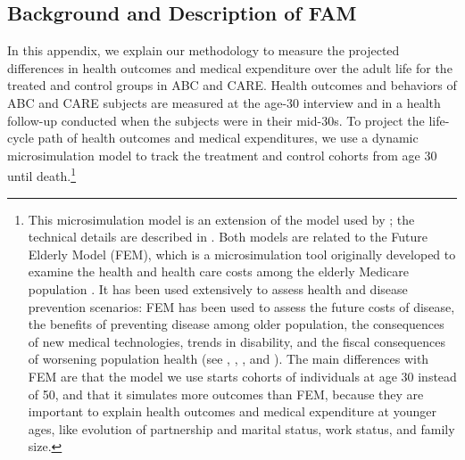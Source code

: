 \subsection{Background and Description of FAM}

\noindent In this appendix, we explain our methodology to measure the projected differences in health outcomes and medical expenditure over the adult life for the treated and control groups in ABC and CARE.
Health outcomes and behaviors of ABC and CARE subjects are measured at the age-30 interview and in a health follow-up conducted when the subjects were in their mid-30s.
To project the life-cycle path of health outcomes and medical expenditures, we use a dynamic microsimulation model to track the treatment and control cohorts from age 30 until death.\footnote{This microsimulation model is an extension of the model used by \citet{Prados_etal_2015_How-Much-Can-Education}; the technical details are described in \citet{Goldman_etal_2015_Future-America-Model}. Both models are related to the Future Elderly Model (FEM), which is a microsimulation tool originally developed to examine the health and health care costs among the elderly Medicare population \citep{Goldman_etal_2004_RAND-Report_Health-Status-Elderly}. It has been used extensively to assess health and disease prevention scenarios: FEM has been used to assess the future costs of disease, the benefits of preventing disease among older population, the consequences of new medical technologies, trends in disability, and the fiscal consequences of worsening population health (see \citet{Goldman_etal_2004_RAND-Report_Health-Status-Elderly}, \citet{Lakdawalla_etal_2004_Health-and-Cost}, \citet{Goldman_etal_2005_HA}, and \citet{Zissimopoulos_etal_2014_Delaying-Alzheimers}). The main differences with FEM are that the model we use starts cohorts of individuals at age 30 instead of 50, and that it simulates more outcomes than FEM, because they are important to explain health outcomes and medical expenditure at younger ages, like evolution of partnership and marital status, work status, and family size.} \\

